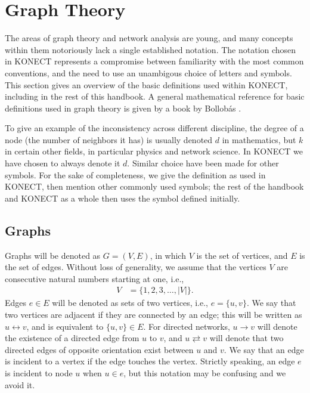 \documentclass{article}
\begin{document}
\section{Graph Theory}
\label{sec:definitions}
The areas of graph theory and network analysis are young, and
many concepts within them notoriously lack a single established notation.  The
notation chosen in KONECT represents a compromise between familiarity
with the most common conventions, and the need to use an unambigous
choice of letters and symbols.  This section gives an overview of the
basic definitions used within KONECT, including in the rest of this handbook. 
A general mathematical reference for basic definitions used in graph
theory is given by a book by Bollobás \citeyearpar{b116}.  

To give an example of the inconsistency across different discipline, the
degree of a node (the number of neighbors it has) is usually denoted $d$
in mathematics, but $k$ in certain other fields, in particular physics
and network science.  In KONECT we have chosen to always denote it $d$.
Similar choice have been made for other symbols.  For the sake of
completeness, we give the definition as used in KONECT, then mention
other commonly used symbols; the rest of the handbook and KONECT as a
whole then uses the symbol defined initially. 

\subsection{Graphs}
Graphs will be denoted as $G=(V,E)$, in which $V$ is the set of
vertices, and $E$ is the set of edges. Without loss of
generality, we assume that the vertices $V$ are consecutive natural
numbers starting at one, i.e.,
\begin{align}
  V &= \{ 1, 2, 3, \dotsc, |V| \}.
\end{align}
Edges $e\in E$ will be denoted as sets of two vertices, i.e.,
$e=\{u,v\}$.  We say that two vertices are adjacent if they are
connected by an edge; this will be written as $u \leftrightarrow v$, and is equivalent to $\{u,v\}\in E$. 
For directed networks, $u \rightarrow v$ will denote the existence of a
directed edge from $u$ to $v$, and $u \rightleftarrows v$ will denote
that two directed edges of opposite orientation exist between $u$ and $v$.
We say that an
edge is incident to a vertex if the edge touches the vertex. Strictly
speaking, an edge $e$ is incident to node $u$ when $u\in e$, but this
notation may be confusing and we avoid it. 
\end{document}
